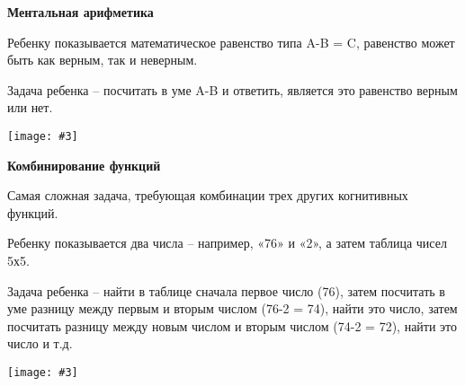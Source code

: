 \documentclass[10pt]{article}
\newcommand{\visualsearch}[3]{
    \begin{center}
        \textbf{\large #1}
    \end{center}

    \vspace{1em}

    #2

    \vspace{1em}

    \texttt{[image: \#3]}
}
\begin{document}
\vspace{0.5em}

\visualsearch{Ментальная арифметика}{
Ребенку показывается математическое равенство типа A-B = C, равенство может быть как верным, так и неверным.

\vspace{0.5em}

Задача ребенка – посчитать в уме A-B и ответить, является это равенство верным или нет.
}{MentalArithmetic.png}

\vspace{0.5em}

\visualsearch{Комбинирование функций}{
Самая сложная задача, требующая комбинации трех других когнитивных функций.

\vspace{0.5em}

Ребенку показывается два числа – например, «76» и «2», а затем таблица чисел 5х5.

\vspace{0.5em}

Задача ребенка – найти в таблице сначала первое число (76), затем посчитать в уме разницу между первым и вторым числом (76-2 = 74), найти это число, затем посчитать разницу между новым числом и вторым числом (74-2 = 72), найти это число и т.д.
}{CombFunction.png}
\end{document}
